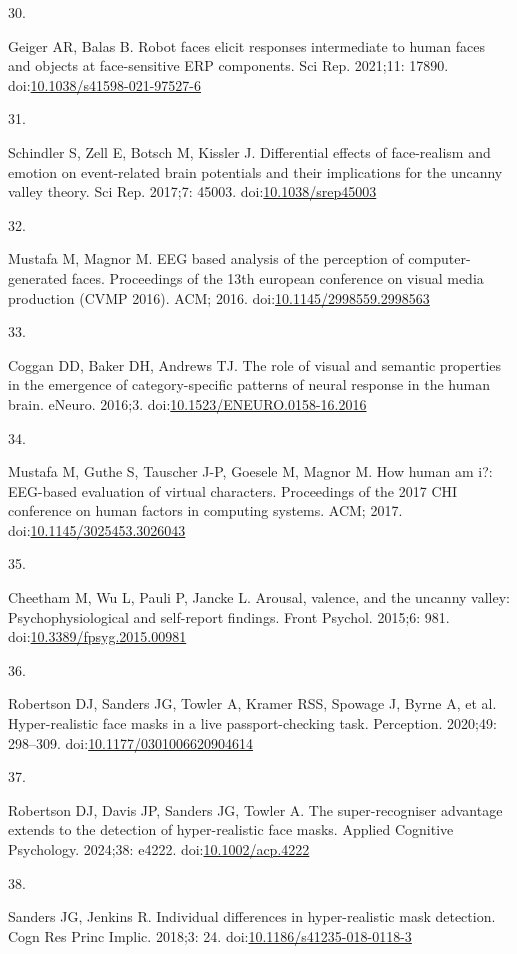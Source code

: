 \documentclass[
]{article}
\newlength{\cslhangindent}
\newlength{\csllabelwidth}
\newenvironment{CSLReferences}[2] %
 {\begin{list}{}{%
  \setlength{\itemindent}{0pt}
  \setlength{\leftmargin}{0pt}
  \setlength{\parsep}{0pt}
  \ifodd #1
   \setlength{\leftmargin}{\cslhangindent}
   \setlength{\itemindent}{-1\cslhangindent}
  \fi
  \setlength{\itemsep}{#2\baselineskip}}}
 {\end{list}}
\newcommand{\CSLLeftMargin}[1]{\parbox[t]{\csllabelwidth}{\strut#1\strut}}
\newcommand{\CSLRightInline}[1]{\parbox[t]{\linewidth - \csllabelwidth}{\strut#1\strut}}
\begin{document}
\begin{CSLReferences}{0}{1}
\CSLLeftMargin{30. }%
\CSLRightInline{Geiger AR, Balas B. Robot faces elicit responses intermediate to human faces and objects at face-sensitive ERP components. Sci Rep. 2021;11: 17890. doi:\href{https://doi.org/10.1038/s41598-021-97527-6}{10.1038/s41598-021-97527-6}}

\CSLLeftMargin{31. }%
\CSLRightInline{Schindler S, Zell E, Botsch M, Kissler J. Differential effects of face-realism and emotion on event-related brain potentials and their implications for the uncanny valley theory. Sci Rep. 2017;7: 45003. doi:\href{https://doi.org/10.1038/srep45003}{10.1038/srep45003}}

\CSLLeftMargin{32. }%
\CSLRightInline{Mustafa M, Magnor M. EEG based analysis of the perception of computer-generated faces. Proceedings of the 13th european conference on visual media production (CVMP 2016). ACM; 2016. doi:\href{https://doi.org/10.1145/2998559.2998563}{10.1145/2998559.2998563}}

\CSLLeftMargin{33. }%
\CSLRightInline{Coggan DD, Baker DH, Andrews TJ. The role of visual and semantic properties in the emergence of category-specific patterns of neural response in the human brain. eNeuro. 2016;3. doi:\href{https://doi.org/10.1523/ENEURO.0158-16.2016}{10.1523/ENEURO.0158-16.2016}}

\CSLLeftMargin{34. }%
\CSLRightInline{Mustafa M, Guthe S, Tauscher J-P, Goesele M, Magnor M. How human am i?: EEG-based evaluation of virtual characters. Proceedings of the 2017 CHI conference on human factors in computing systems. ACM; 2017. doi:\href{https://doi.org/10.1145/3025453.3026043}{10.1145/3025453.3026043}}

\CSLLeftMargin{35. }%
\CSLRightInline{Cheetham M, Wu L, Pauli P, Jancke L. Arousal, valence, and the uncanny valley: Psychophysiological and self-report findings. Front Psychol. 2015;6: 981. doi:\href{https://doi.org/10.3389/fpsyg.2015.00981}{10.3389/fpsyg.2015.00981}}

\CSLLeftMargin{36. }%
\CSLRightInline{Robertson DJ, Sanders JG, Towler A, Kramer RSS, Spowage J, Byrne A, et al. Hyper-realistic face masks in a live passport-checking task. Perception. 2020;49: 298--309. doi:\href{https://doi.org/10.1177/0301006620904614}{10.1177/0301006620904614}}

\CSLLeftMargin{37. }%
\CSLRightInline{Robertson DJ, Davis JP, Sanders JG, Towler A. The super-recogniser advantage extends to the detection of hyper-realistic face masks. Applied Cognitive Psychology. 2024;38: e4222. doi:\href{https://doi.org/10.1002/acp.4222}{10.1002/acp.4222}}

\CSLLeftMargin{38. }%
\CSLRightInline{Sanders JG, Jenkins R. Individual differences in hyper-realistic mask detection. Cogn Res Princ Implic. 2018;3: 24. doi:\href{https://doi.org/10.1186/s41235-018-0118-3}{10.1186/s41235-018-0118-3}}

\end{CSLReferences}
\end{document}
